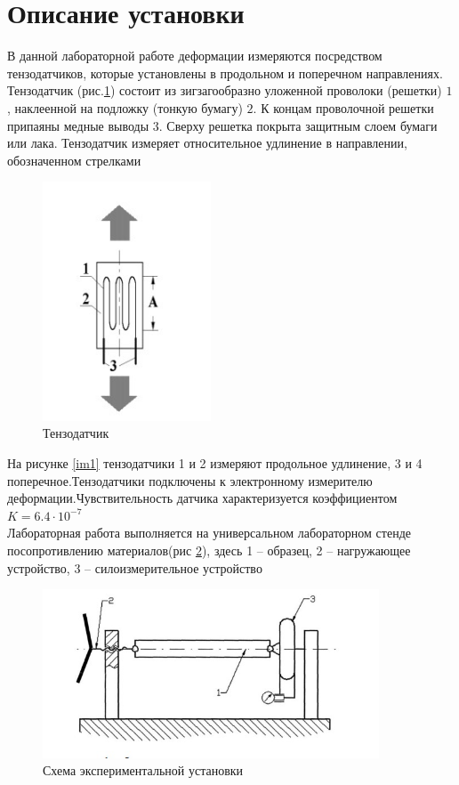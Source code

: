 \documentclass[12pt, a4paper]{article}
\begin{document}
\newpage

\section*{Описание установки}
	В данной лабораторной работе деформации измеряются посредством тензодатчиков, которые установлены в продольном и поперечном направлениях. Тензодатчик (рис.\ref{im2}) состоит из зигзагообразно уложенной проволоки (решетки) $1$, наклеенной на подложку (тонкую бумагу) $2$. К концам проволочной решетки припаяны медные выводы $3$. Сверху решетка покрыта защитным слоем бумаги или лака. Тензодатчик измеряет относительное удлинение в направлении, обозначенном стрелками 

\begin{figure}[h]
        \centering
        \includegraphics[width = 5cm]{Lab2_2.jpg}
        \caption{Тензодатчик}
        \label{im2}
    \end{figure}

На рисунке \ref{im1} тензодатчики 1 и 2 измеряют продольное удлинение, 3 и 4 поперечное.Тензодатчики подключены к электронному измерителю деформации.Чувствительность датчика характеризуется коэффициентом $K = 6.4 \cdot 10^{-7}$ \\
	Лабораторная работа выполняется на универсальном лабораторном 
стенде посопротивлению материалов(рис \ref{im3}), здесь 1 -- образец, 2 -- нагружающее устройство, 3 -- силоизмерительное устройство
\begin{figure}[h]
        \centering
        \includegraphics[width = 10cm]{Lab2_3.jpg}
        \caption{Схема экспериментальной установки}
        \label{im3}
    \end{figure}
\end{document}
